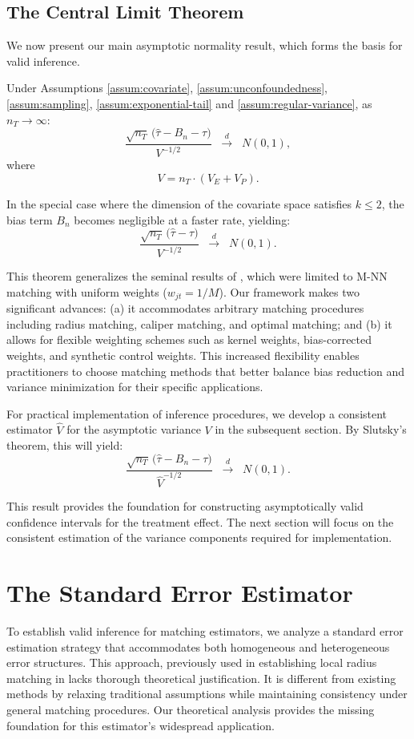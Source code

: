 \documentclass{mytemplate}
\begin{document}
\subsection{The Central Limit Theorem}
\label{sec:CLT}
We now present our main asymptotic normality result, which forms the basis for valid inference.
\begin{theorem}
\label{thm:clt}
Under Assumptions \ref{assum:covariate}, \ref{assum:unconfoundedness}, \ref{assum:sampling}, \ref{assum:exponential-tail} and  \ref{assum:regular-variance}, as $n_T \rightarrow \infty$:
\[
    \frac{\sqrt{n_T}\,\bigl( \hat \tau - B_n - \tau \bigr)}{V^{-1/2}} 
    \;\;\xrightarrow{d}\;\;  
    N(0,1),
\]
where 
\[
    V = n_T \cdot (V_E + V_P).
\]
\end{theorem}
In the special case where the dimension of the covariate space satisfies $k \le 2$, the bias term $B_n$ becomes negligible at a faster rate, yielding:
\[
    \frac{\sqrt{n_T}\,\bigl( \hat \tau - \tau \bigr)}{V^{-1/2}} 
    \;\;\xrightarrow{d}\;\;  
    N(0,1).
\]

This theorem generalizes the seminal results of \cite{abadie2006large}, which were limited to M-NN matching with uniform weights ($w_{jt} = 1/M$). Our framework makes two significant advances: (a) it accommodates arbitrary matching procedures including radius matching, caliper matching, and optimal matching; and (b) it allows for flexible weighting schemes such as kernel weights, bias-corrected weights, and synthetic control weights. This increased flexibility enables practitioners to choose matching methods that better balance bias reduction and variance minimization for their specific applications.

For practical implementation of inference procedures, we develop a consistent estimator $\hat{V}$ for the asymptotic variance $V$ in the subsequent section. By Slutsky's theorem, this will yield:
\[
    \frac{\sqrt{n_T}\,\bigl( \hat \tau - B_n - \tau \bigr)}{\hat V^{-1/2}} 
    \;\;\xrightarrow{d}\;\;  
    N(0,1).
\]

This result provides the foundation for constructing asymptotically valid confidence intervals for the treatment effect. The next section will focus on the consistent estimation of the variance components required for implementation.




\section{The Standard Error Estimator}
To establish valid inference for matching estimators, we analyze a standard error estimation strategy that accommodates both homogeneous and heterogeneous error structures. This approach, previously used in establishing local radius matching in \cite{che2024caliper}  lacks thorough theoretical justification. It is different from existing methods by relaxing traditional assumptions while maintaining consistency under general matching procedures. Our theoretical analysis provides the missing foundation for this estimator's widespread application.
\end{document}
